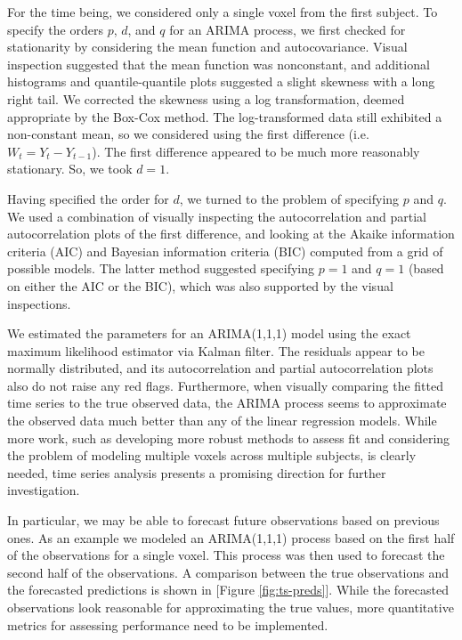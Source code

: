 \par \indent For the time being, we considered only a single voxel from the first subject. To specify the orders $p$, $d$, and $q$ for an ARIMA process, we first checked for stationarity by considering the mean function and autocovariance. Visual inspection suggested that the mean function was nonconstant, and additional histograms and quantile-quantile plots suggested a slight skewness with a long right tail. We corrected the skewness using a log transformation, deemed appropriate by the Box-Cox method. The log-transformed data still exhibited a non-constant mean, so we considered using the first difference (i.e. $W_t = Y_t - Y_{t-1}$). The first difference appeared to be much more reasonably stationary. So, we took $d=1$. 

\par Having specified the order for $d$, we turned to the problem of specifying $p$ and $q$. We used a combination of visually inspecting the autocorrelation and partial autocorrelation plots of the first difference, and looking at the Akaike information criteria (AIC) and Bayesian information criteria (BIC) computed from a grid of possible models. The latter method suggested specifying $p=1$ and $q=1$ (based on either the AIC or the BIC), which was also supported by the visual inspections. 

\par We estimated the parameters for an ARIMA(1,1,1) model using the exact maximum likelihood estimator via Kalman filter. The residuals appear to be normally distributed, and its autocorrelation and partial autocorrelation plots also do not raise any red flags. Furthermore, when visually comparing the fitted time series to the true observed data, the ARIMA process seems to approximate the observed data much better than any of the linear regression models. While more work, such as developing more robust methods to assess fit and considering the problem of modeling multiple voxels across multiple subjects, is clearly needed, time series analysis presents a promising direction for further investigation. 

\par In particular, we may be able to forecast future observations based on previous ones. As an example we modeled an ARIMA(1,1,1) process based on the first half of the observations for a single voxel. This process was then used to forecast the second half of the observations. A comparison between the true observations and the forecasted predictions is shown in [Figure \ref{fig:ts-preds}]. While the forecasted observations look reasonable for approximating the true values, more quantitative metrics for assessing performance need to be implemented. 

